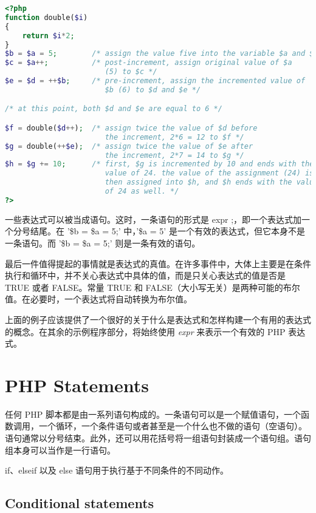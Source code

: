 \begin{lstlisting}[language=PHP]
<?php
function double($i)
{
    return $i*2;
}
$b = $a = 5;        /* assign the value five into the variable $a and $b */
$c = $a++;          /* post-increment, assign original value of $a
                       (5) to $c */
$e = $d = ++$b;     /* pre-increment, assign the incremented value of
                       $b (6) to $d and $e */

/* at this point, both $d and $e are equal to 6 */

$f = double($d++);  /* assign twice the value of $d before
                       the increment, 2*6 = 12 to $f */
$g = double(++$e);  /* assign twice the value of $e after
                       the increment, 2*7 = 14 to $g */
$h = $g += 10;      /* first, $g is incremented by 10 and ends with the
                       value of 24. the value of the assignment (24) is
                       then assigned into $h, and $h ends with the value
                       of 24 as well. */
?>
\end{lstlisting}

一些表达式可以被当成语句。这时，一条语句的形式是 expr ;，即一个表达式加一个分号结尾。在 '\$b = \$a = 5;' 中，'\$a = 5' 是一个有效的表达式，但它本身不是一条语句。而 '\$b = \$a = 5;' 则是一条有效的语句。

最后一件值得提起的事情就是表达式的真值。在许多事件中，大体上主要是在条件执行和循环中，并不关心表达式中具体的值，而是只关心表达式的值是否是 TRUE 或者 FALSE。常量 TRUE 和 FALSE（大小写无关）是两种可能的布尔值。在必要时，一个表达式将自动转换为布尔值。

上面的例子应该提供了一个很好的关于什么是表达式和怎样构建一个有用的表达式的概念。在其余的示例程序部分，将始终使用 \textsl{expr} 来表示一个有效的 PHP 表达式。


\chapter{PHP Statements}

任何 PHP 脚本都是由一系列语句构成的。一条语句可以是一个赋值语句，一个函数调用，一个循环，一个条件语句或者甚至是一个什么也不做的语句（空语句）。语句通常以分号结束。此外，还可以用花括号将一组语句封装成一个语句组。语句组本身可以当作是一行语句。


if、elseif 以及 else 语句用于执行基于不同条件的不同动作。



\section{Conditional statements}

